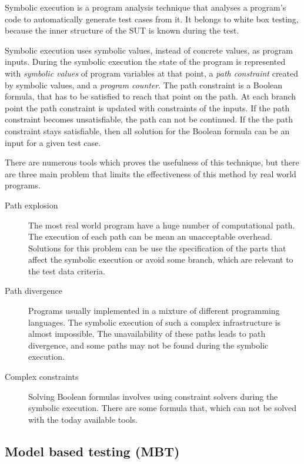 \documentclass{article}
\begin{document}
Symbolic execution is a program analysis technique that analyses a program’s code to automatically generate test cases from it. It belongs to white box testing, because the inner structure of the SUT is known during the test.

Symbolic execution uses symbolic values, instead of concrete values, as program inputs. During the symbolic execution the state of the program is represented with \textit{symbolic values} of program variables at that point, a \textit{path constraint} created by symbolic values, and a \textit{program counter}. The path constraint is a Boolean formula, that has to be satisfied to reach that point on the path. At each branch point the path constraint is updated with constraints of the inputs. If the path constraint becomes unsatisfiable, the path can not be continued. If the the path constraint stays satisfiable, then all solution for the Boolean formula can be an input for a given test case.

There are numerous tools which proves the usefulness of this technique, but there are three main problem that limits the effectiveness of this method by real world programs.

\begin{description}
	\item[Path explosion] The most real world program have a huge number of computational path. The execution of each path can be mean an unacceptable overhead. Solutions for this problem can be use the specification of the parts that affect the symbolic execution or avoid some branch, which are relevant to the test data criteria.
	\item[Path divergence] Programs usually implemented in a mixture of different programming languages. The symbolic execution of such a complex infrastructure is almost impossible. The unavailability of these paths leads to path divergence, and some paths may not be found during the symbolic execution.
	\item[Complex constraints] Solving Boolean formulas involves using constraint solvers during the symbolic execution. There are some formula that, which can not be solved with the today available tools.
\end{description}


\subsection{Model based testing (MBT)}
\label{sub:mbt}
\end{document}
